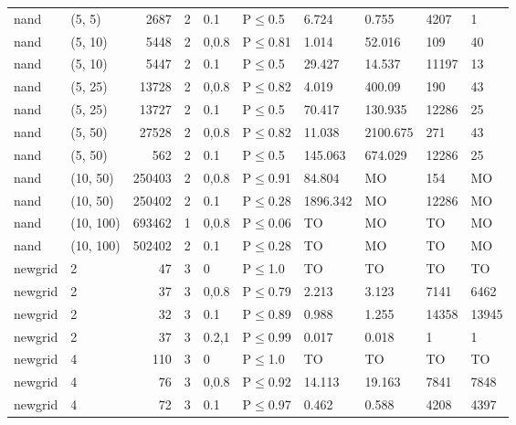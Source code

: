 \begin{longtable}{llrrllllll}
 nand          & (5, 5)    &   	2687 &   2 & 0.1   & P$\leq$0.5   & 6.724    & 0.755    & 4207    & 1       \\
 nand          & (5, 10)   &   	5448 &   2 & 0,0.8 & P$\leq$0.81  & 1.014    & 52.016   & 109     & 40      \\
 nand          & (5, 10)   &   	5447 &   2 & 0.1   & P$\leq$0.5   & 29.427   & 14.537   & 11197   & 13      \\
 nand          & (5, 25)   &  	13728 &   2 & 0,0.8 & P$\leq$0.82  & 4.019    & 400.09   & 190     & 43      \\
 nand          & (5, 25)   &  	13727 &   2 & 0.1   & P$\leq$0.5   & 70.417   & 130.935  & 12286   & 25      \\
 nand          & (5, 50)   &  	27528 &   2 & 0,0.8 & P$\leq$0.82  & 11.038   & 2100.675 & 271     & 43      \\
 nand          & (5, 50)   &    	562 &   2 & 0.1   & P$\leq$0.5   & 145.063  & 674.029  & 12286   & 25      \\
 nand          & (10, 50)  & 	250403 &   2 & 0,0.8 & P$\leq$0.91  & 84.804   & MO       & 154     & MO      \\
 nand          & (10, 50)  & 	250402 &   2 & 0.1   & P$\leq$0.28  & 1896.342 & MO       & 12286   & MO      \\
 nand          & (10, 100) & 	693462 &   1 & 0,0.8 & P$\leq$0.06  & TO       & MO       & TO      & MO      \\
 nand          & (10, 100) & 	502402 &   2 & 0.1   & P$\leq$0.28  & TO       & MO       & TO      & MO      \\
 newgrid       & 2         &     	47 &   3 & 0     & P$\leq$1.0   & TO       & TO       & TO      & TO      \\
 newgrid       & 2         &     	37 &   3 & 0,0.8 & P$\leq$0.79  & 2.213    & 3.123    & 7141    & 6462    \\
 newgrid       & 2         &     	32 &   3 & 0.1   & P$\leq$0.89  & 0.988    & 1.255    & 14358   & 13945   \\
 newgrid       & 2         &     	37 &   3 & 0.2,1 & P$\leq$0.99  & 0.017    & 0.018    & 1       & 1       \\
 newgrid       & 4         &    	110 &   3 & 0     & P$\leq$1.0   & TO       & TO       & TO      & TO      \\
 newgrid       & 4         &     	76 &   3 & 0,0.8 & P$\leq$0.92  & 14.113   & 19.163   & 7841    & 7848    \\
 newgrid       & 4         &     	72 &   3 & 0.1   & P$\leq$0.97  & 0.462    & 0.588    & 4208    & 4397    \\

\end{longtable}
